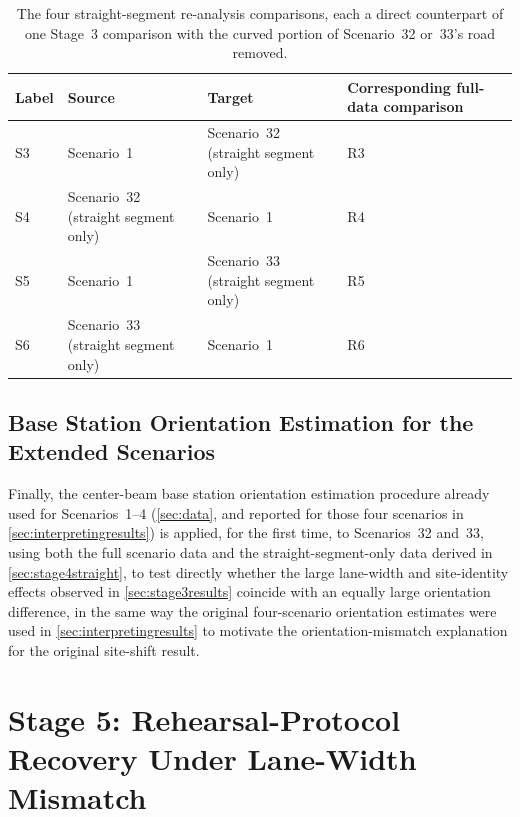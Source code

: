 \documentclass{iutbscthesis}
\begin{document}
\begin{table}[H]
    \centering
    \begin{tabularx}{\textwidth}{
        >{\raggedright\arraybackslash}X
        >{\raggedright\arraybackslash}X
        >{\raggedright\arraybackslash}X
        >{\raggedright\arraybackslash}X
    }
        \toprule
        Label & Source & Target & Corresponding full-data comparison \\
        \midrule
        S3 & Scenario~1 & Scenario~32 (straight segment only) & R3 \\
        S4 & Scenario~32 (straight segment only) & Scenario~1 & R4 \\
        S5 & Scenario~1 & Scenario~33 (straight segment only) & R5 \\
        S6 & Scenario~33 (straight segment only) & Scenario~1 & R6 \\
        \bottomrule
    \end{tabularx}
    \caption{The four straight-segment re-analysis comparisons, each a direct counterpart of one Stage~3 comparison with the curved portion of Scenario~32 or~33's road removed.}
    \label{tab:stage4straightcomparisons}
\end{table}

\subsection{Base Station Orientation Estimation for the Extended Scenarios}
\label{sec:stage4orientation}

Finally, the center-beam base station orientation estimation procedure already used for Scenarios~1--4 (\autoref{sec:data}, and reported for those four scenarios in \autoref{sec:interpretingresults}) is applied, for the first time, to Scenarios~32 and~33, using both the full scenario data and the straight-segment-only data derived in \autoref{sec:stage4straight}, to test directly whether the large lane-width and site-identity effects observed in \autoref{sec:stage3results} coincide with an equally large orientation difference, in the same way the original four-scenario orientation estimates were used in \autoref{sec:interpretingresults} to motivate the orientation-mismatch explanation for the original site-shift result.

\section{Stage 5: Rehearsal-Protocol Recovery Under Lane-Width Mismatch}
\label{sec:stage5}
\end{document}
